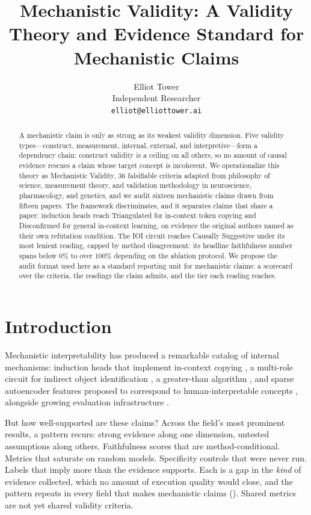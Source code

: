 \documentclass{article}
\title{Mechanistic Validity: A Validity Theory and Evidence Standard for Mechanistic Claims}
\author{%
  Elliot Tower \\
  Independent Researcher \\
  \texttt{elliot@elliottower.ai}
}
\begin{document}
\maketitle

\begin{abstract}
A mechanistic claim is only as strong as its weakest validity dimension. Five validity types---construct, measurement, internal, external, and interpretive---form a dependency chain: construct validity is a ceiling on all others, so no amount of causal evidence rescues a claim whose target concept is incoherent. We operationalize this theory as Mechanistic Validity, 36 falsifiable criteria adapted from philosophy of science, measurement theory, and validation methodology in neuroscience, pharmacology, and genetics, and we audit sixteen mechanistic claims drawn from fifteen papers. The framework discriminates, and it separates claims that share a paper: induction heads reach Triangulated for in-context token copying and Disconfirmed for general in-context learning, on evidence the original authors named as their own refutation condition. The IOI circuit reaches Causally Suggestive under its most lenient reading, capped by method disagreement: its headline faithfulness number spans below 0\% to over 100\% depending on the ablation protocol. We propose the audit format used here as a standard reporting unit for mechanistic claims: a scorecard over the criteria, the readings the claim admits, and the tier each reading reaches.
\end{abstract}

\section{Introduction}
\label{sec:intro}

Mechanistic interpretability has produced a remarkable catalog of internal mechanisms:
induction heads that implement in-context copying \citep{olsson2022context}, a multi-role
circuit for indirect object identification \citep{wang2023interpretability}, a greater-than
algorithm \citep{hanna2023greater}, and sparse autoencoder features proposed to correspond
to human-interpretable concepts \citep{cunningham2024sparse, bricken2023monosemanticity}, alongside growing evaluation infrastructure \citep{miller2024transformer, mueller2025mib, karvonen2025saebench, chan2022causal}.

But how well-supported are these claims? Across the field's most prominent results, a pattern recurs: strong evidence along one dimension, untested assumptions along others. Faithfulness scores that are method-conditional. Metrics that saturate on random models. Specificity controls that were never run. Labels that imply more than the evidence supports. Each is a gap in the \emph{kind} of evidence collected, which no amount of execution quality would close, and the pattern repeats in every field that makes mechanistic claims (). Shared metrics are not yet shared validity criteria.
\end{document}
